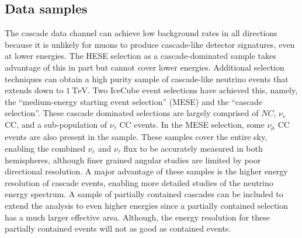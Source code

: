 \subsection{Data samples}
The cascade data channel can achieve low background rates in all directions because it is unlikely for muons to produce cascade-like detector signatures, even at lower energies.
The HESE selection as a cascade-dominated sample takes advantage of this in part but cannot cover lower energies.
Additional selection techniques can obtain a high purity sample of cascade-like neutrino events that extends down to $\SI{1}\TeV$.
Two IceCube event selections have achieved this, namely, the ``medium-energy starting event selection'' (MESE) and the ``cascade selection''.
These cascade dominated selections are largely comprised of $NC$, $\nu_e$ CC, and a sub-population of $\nu_\tau$ CC events.
In the MESE selection, some $\nu_\mu$ CC events are also present in the sample.
These samples cover the entire sky, enabling the combined $\nu_e$ and $\nu_\tau$ flux to be accurately measured in both hemispheres, although finer grained angular studies are limited by poor directional resolution.
A major advantage of these samples is the higher energy resolution of cascade events, enabling more detailed studies of the neutrino energy spectrum.
A sample of partially contained cascades can be included to extend the analysis to even higher energies since a partially contained selection has a much larger effective area.
Although, the energy resolution for these partially contained events will not as good as contained events.

